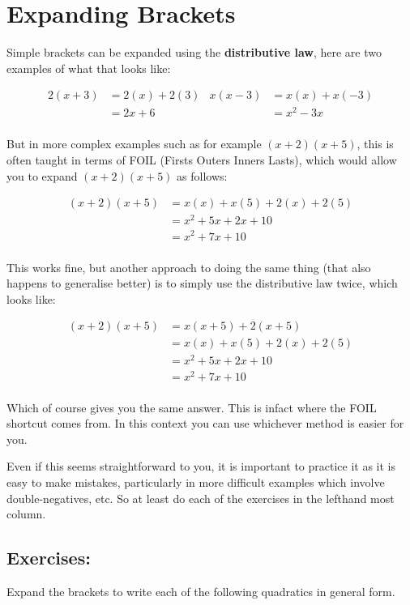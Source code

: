 \documentclass[12pt]{article}
\begin{document}
\pagebreak
\section*{Expanding Brackets}


Simple brackets can be expanded using the \textbf{distributive law}, here are two examples of what that looks like:

\begin{align*}
2(x + 3)  &= 2(x) + 2(3)  & x(x - 3)  &= x(x) + x(-3) \\
          &= 2x + 6       &           &= x^2 - 3x \\ 
\end{align*}

But in more complex examples such as for example $(x+2)(x+5)$, this is often taught in terms of FOIL (Firsts Outers Inners Lasts), which would allow you to expand $(x+2)(x+5)$ as follows:

\begin{align*}
(x+2)(x+5)  &= x(x) + x(5) + 2(x) + 2(5) \\
            &= x^2 + 5x + 2x + 10 \\
            &= x^2 + 7x + 10 \\
\end{align*}

This works fine, but another approach to doing the same thing (that also happens to generalise better) is to simply use the distributive law twice, which looks like: 

\begin{align*}
(x+2)(x+5)  &= x(x+5) + 2(x+5) \\
            &= x(x) + x(5) + 2(x) + 2(5) \\
            &= x^2 + 5x + 2x + 10 \\
            &= x^2 + 7x + 10 \\
\end{align*}

Which of course gives you the same answer. This is infact where the FOIL shortcut comes from. In this context you can use whichever method is easier for you. 

Even if this seems straightforward to you, it is important to practice it as it is easy to make mistakes, particularly in more difficult examples which involve double-negatives, etc. So at least do each of the exercises in the lefthand most column.

\pagebreak
\subsection*{Exercises:}
Expand the brackets to write each of the following quadratics in general form. \\
\end{document}
